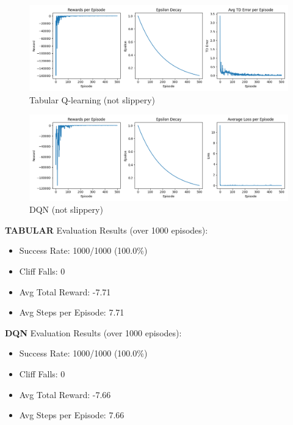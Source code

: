 \documentclass[a4paper,12pt]{article}
\begin{document}
\begin{figure}[H]
    \centering
    \includegraphics[width=\linewidth]{2_32_0995_64_rand_tab.png}
    \caption{Tabular Q-learning (not slippery)}
\end{figure}
\begin{figure}[H]
    \centering
    \includegraphics[width=\linewidth]{2_32_0995_64_rand_dqn.png}
    \caption{DQN (not slippery)}
\end{figure}
\noindent \textbf{TABULAR} Evaluation Results (over 1000 episodes):
\begin{itemize}
    \item Success Rate: 1000/1000 (100.0\%)
    \item Cliff Falls: 0
    \item Avg Total Reward: -7.71
    \item Avg Steps per Episode: 7.71
\end{itemize}
\textbf{DQN} Evaluation Results (over 1000 episodes):
\begin{itemize}
    \item Success Rate: 1000/1000 (100.0\%)
    \item Cliff Falls: 0
    \item Avg Total Reward: -7.66
    \item Avg Steps per Episode: 7.66
\end{itemize}
\end{document}
